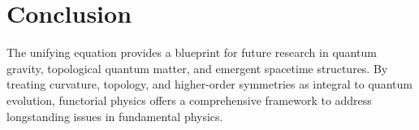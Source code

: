 \documentclass[12pt]{article}
\begin{document}
\section{Conclusion}
The unifying equation provides a blueprint for future research in quantum gravity, topological quantum matter, and emergent spacetime structures. By treating curvature, topology, and higher-order symmetries as integral to quantum evolution, functorial physics offers a comprehensive framework to address longstanding issues in fundamental physics.
\end{document}
